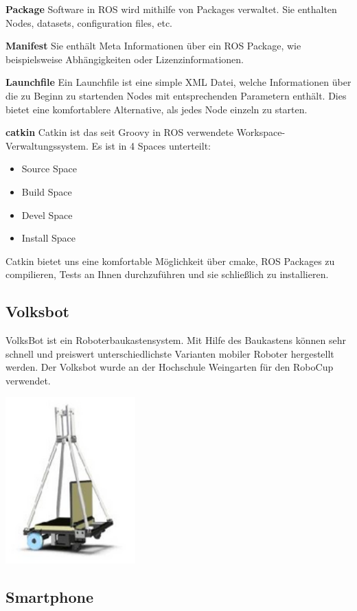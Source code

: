\documentclass[12pt]{article}
\begin{document}
{\bf Package} Software in ROS wird mithilfe von Packages verwaltet.
Sie enthalten Nodes, datasets, configuration files, etc.

{\bf Manifest} Sie enthält Meta Informationen über ein ROS Package, wie beispielsweise Abhängigkeiten oder Lizenzinformationen.

{\bf Launchfile} Ein Launchfile ist eine simple XML Datei, welche Informationen über die zu Beginn zu startenden Nodes mit entsprechenden Parametern enthält.
Dies bietet eine komfortablere Alternative, als jedes Node einzeln zu starten.
 
{\bf catkin} Catkin ist das seit Groovy in ROS verwendete Workspace-Verwaltungssystem.
Es ist in 4 Spaces unterteilt:
\begin{itemize}
\item Source Space
\item Build Space
\item Devel Space
\item Install Space
\end{itemize}
Catkin bietet uns eine komfortable Möglichkeit über cmake, ROS Packages zu compilieren, Tests an Ihnen durchzuführen und sie schließlich zu installieren.

\subsection{Volksbot}
\parbox{8cm}{
VolksBot ist ein Roboterbaukastensystem.
Mit Hilfe des Baukastens können sehr schnell und preiswert unterschiedlichste Varianten mobiler Roboter hergestellt werden.
Der Volksbot wurde an der Hochschule Weingarten für den RoboCup verwendet.
}\hfill
\parbox{5cm}{
\includegraphics[width=5cm]{Volksbot.jpg}
}
\subsection{Smartphone}
\end{document}
